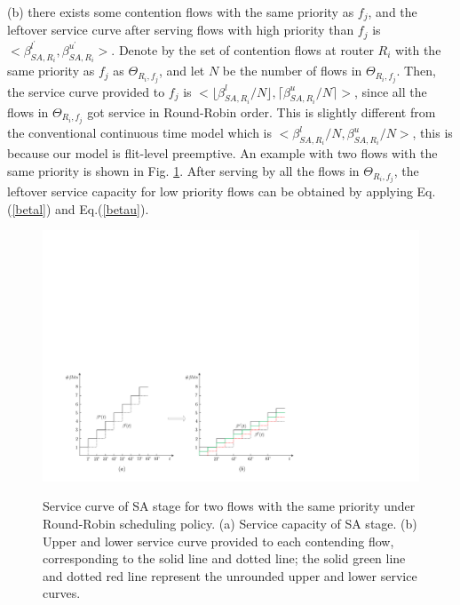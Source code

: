 \documentclass[10pt,journal]{IEEEtran}
\begin{document}
(b) there exists some contention flows with the same priority as $f_j$, and the leftover service curve after serving flows with high priority than $f_j$ is $<\beta_{SA,R_i}^{l^\prime},\beta_{SA,R_i}^{u^\prime}>$. Denote by the set of contention flows at router $R_i$ with the same priority as $f_j$ as $\Theta_{R_i,f_j}$, and let $N$ be the number of flows in $\Theta_{R_i,f_j}$. Then, the service curve provided to $f_j$ is $<\lfloor\beta^l_{SA,R_i}/N\rfloor,\lceil\beta^u_{SA,R_i}/N\rceil>$, since all the flows in $\Theta_{R_i,f_j}$ got service in Round-Robin order. This is slightly different from the conventional continuous time model which is $<\beta^l_{SA,R_i}/N,\beta^u_{SA,R_i}/N>$, this is because our model is flit-level preemptive. An example with two flows with the same priority is shown in Fig. \ref{roundrobin}. After serving by all the flows in $\Theta_{R_i,f_j}$, the leftover service capacity for low priority flows can be obtained by applying Eq.(\ref{betal}) and Eq.(\ref{betau}).
\begin{figure}
  \centering
  \includegraphics[scale=0.5]{figures/RoundRobin.pdf}\\
  \caption{Service curve of SA stage for two flows with the same priority under Round-Robin scheduling policy. (a) Service capacity of SA stage. (b) Upper and lower service curve provided to each contending flow, corresponding to the solid line and dotted line; the solid green line and dotted red line represent the unrounded upper and lower service curves.}\label{roundrobin}
\end{figure}
\end{document}
